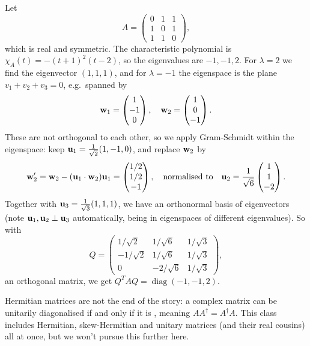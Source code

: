 \documentclass[a4paper]{scrartcl}
\newcommand{\diag}{\operatorname{diag}}
\begin{document}
\begin{example}
	Let
	$$
	A = \begin{pmatrix}
		0 & 1 & 1 \\ 1 & 0 & 1 \\ 1 & 1 & 0
	\end{pmatrix},
	$$
	which is real and symmetric. The characteristic polynomial is $\chi_A(t) = -(t+1)^2(t - 2)$, so the eigenvalues are $-1, -1, 2$. For $\lambda = 2$ we find the eigenvector $(1,1,1)$, and for $\lambda = -1$ the eigenspace is the plane $v_1 + v_2 + v_3 = 0$, e.g.\ spanned by
	$$
	\mathbf{w}_1 = \begin{pmatrix} 1 \\ -1 \\ 0\end{pmatrix}, \quad \mathbf{w}_2 = \begin{pmatrix} 1 \\ 0 \\ -1 \end{pmatrix}.
	$$
	These are not orthogonal to each other, so we apply Gram-Schmidt within the eigenspace: keep $\mathbf{u}_1 = \frac{1}{\sqrt{2}}(1, -1, 0)$, and replace $\mathbf{w}_2$ by
	$$
	\mathbf{w}_2' = \mathbf{w}_2 - (\mathbf{u}_1 \cdot \mathbf{w}_2)\mathbf{u}_1 = \begin{pmatrix} 1/2 \\ 1/2 \\ -1\end{pmatrix}, \quad \text{normalised to} \quad \mathbf{u}_2 = \frac{1}{\sqrt 6}\begin{pmatrix} 1 \\ 1 \\ -2 \end{pmatrix}.
	$$
	Together with $\mathbf{u}_3 = \frac{1}{\sqrt{3}}(1,1,1)$, we have an orthonormal basis of eigenvectors (note $\mathbf{u}_1, \mathbf{u}_2 \perp \mathbf{u}_3$ automatically, being in eigenspaces of different eigenvalues). So with
	$$
	Q = \begin{pmatrix}
		1/\sqrt 2 & 1/\sqrt 6 & 1/\sqrt 3 \\
		-1/\sqrt 2 & 1/\sqrt 6 & 1/\sqrt 3 \\
		0 & -2/\sqrt 6 & 1/\sqrt 3
	\end{pmatrix},
	$$
	an orthogonal matrix, we get $Q^TAQ = \diag(-1, -1, 2)$.
\end{example}

\begin{remark}
	Hermitian matrices are not the end of the story: a complex matrix can be unitarily diagonalised if and only if it is , meaning $A A^\dagger = A^\dagger A$. This class includes Hermitian, skew-Hermitian and unitary matrices (and their real cousins) all at once, but we won't pursue this further here.
\end{remark}
\end{document}
